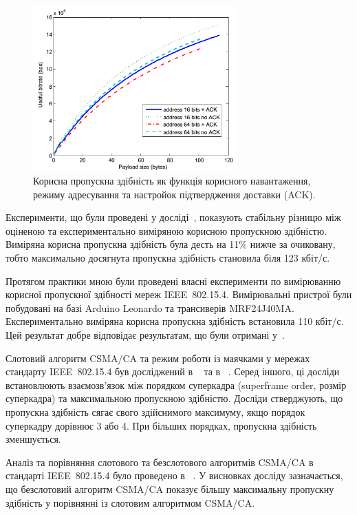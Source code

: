 \documentclass[a4paper,ukrainian,utf8,nocolumnsxix,floatsection]{eskdtext}
\newcommand{\iee}[0]{IEEE~802.15.4\xspace}
\newcommand{\csma}[0]{CSMA/CA\xspace}
\begin{document}
\begin{figure}[bth]
	\centering
	\includegraphics[width=0.7\textwidth]{img/throughput_graph.png}
	\caption{\label{fig:throughput_graph}Корисна пропускна здібність як функція корисного навантаження, режиму адресування та настройок підтвердження доставки (ACK).}
\end{figure}

Експерименти, що були проведені у досліді~\cite{thoroughput:analysis:unslotted:ieee}, показують стабільну різницю між оціненою та експериментально виміряною корисною пропускною здібністю. Виміряна корисна пропускна здібність була десть на 11\% нижче за очиковану, тобто максимально досягнута пропускна здібність становила біля 123 кбіт/с.

Протягом практики мною були проведені власні експерименти по вимірюванню корисної пропускної здібності мереж \iee. Вимірювальні пристрої були побудовані на базі Arduino Leonardo та трансиверів MRF24J40MA. Експериментально виміряна корисна пропускна здібність встановила 110 кбіт/с. Цей результат добре відповідає результатам, що були отримані у~\cite{thoroughput:analysis:unslotted:ieee}.

Слотовий алгоритм \csma та режим роботи із маячками у мережах стандарту \iee був досліджений в ~\cite{simulation:study:slotted:ieee} та в ~\cite{gts:allocation:analysis}. Серед іншого, ці досліди встановлюють взаємозв'язок між порядком суперкадра (superframe order, розмір суперкадра) та максимальною пропускною здібністю. Досліди стверджують, що пропускна здібність сягає свого здійснимого максимуму, якщо порядок суперкадру дорівнює 3 або 4. При більших порядках, пропускна здібність зменшується.

Аналіз та порівняння слотового та безслотового алгоритмів \csma в стандарті \iee було проведено в ~\cite{analysis:slotted:unslotted}. У висновках досліду зазначається, що безслотовий алгоритм \csma  показує більшу максимальну пропускну здібність у порівнянні із слотовим алгоритмом \csma.
\end{document}

